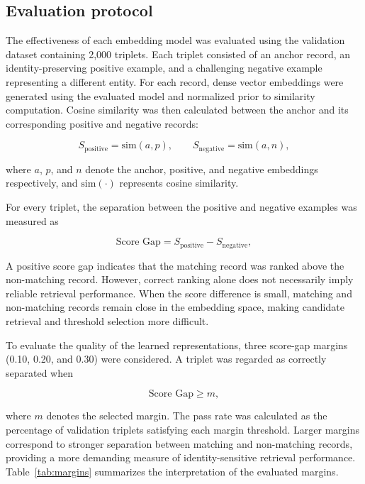 \documentclass{article}
\begin{document}
\subsection{Evaluation protocol}
\label{sec:eval}

The effectiveness of each embedding model was evaluated using the validation dataset containing 2,000 triplets. Each triplet consisted of an anchor record, an identity-preserving positive example, and a challenging negative example representing a different entity. For each record, dense vector embeddings were generated using the evaluated model and normalized prior to similarity computation. Cosine similarity was then calculated between the anchor and its corresponding positive and negative records:

\begin{equation}
  S_{\text{positive}} = \mathrm{sim}(a, p), \qquad
  S_{\text{negative}} = \mathrm{sim}(a, n),
  \label{eq:sim}
\end{equation}

where $a$, $p$, and $n$ denote the anchor, positive, and negative embeddings respectively, and $\mathrm{sim}(\cdot)$ represents cosine similarity.

For every triplet, the separation between the positive and negative examples was measured as

\begin{equation}
  \text{Score Gap} = S_{\text{positive}} - S_{\text{negative}},
  \label{eq:gap}
\end{equation}

A positive score gap indicates that the matching record was ranked above the non-matching record. However, correct ranking alone does not necessarily imply reliable retrieval performance. When the score difference is small, matching and non-matching records remain close in the embedding space, making candidate retrieval and threshold selection more difficult.

To evaluate the quality of the learned representations, three score-gap margins (0.10, 0.20, and 0.30) were considered. A triplet was regarded as correctly separated when

\begin{equation}
  \text{Score Gap} \geq m,
  \label{eq:margin}
\end{equation}

where $m$ denotes the selected margin. The pass rate was calculated as the percentage of validation triplets satisfying each margin threshold. Larger margins correspond to stronger separation between matching and non-matching records, providing a more demanding measure of identity-sensitive retrieval performance. Table~\ref{tab:margins} summarizes the interpretation of the evaluated margins.
\end{document}

